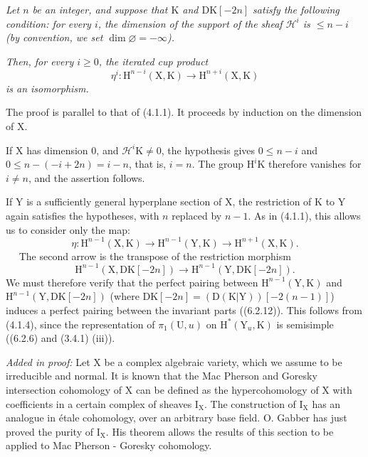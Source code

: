 \documentclass[11pt,leqno]{article}
\newcommand{\Page}[1]{\ifvmode\noindent\else\unskip\ \fi{\footnotesize\textcolor{gray}{[p.\,#1]}}\ \ignorespaces}
\begin{document}
\textit{Let \(n\) be an integer, and suppose that \(\mathrm{K}\) and \(\mathrm{DK}[-2n]\) satisfy the following condition: for every \(i\), the dimension of the support of the sheaf \(\mathscr{H}^i\) is \(\leq n-i\) (by convention, we set \(\dim\varnothing=-\infty\)).}

\textit{Then, for every \(i\geq0\), the iterated cup product}
\[
\eta^i:\mathrm{H}^{n-i}(\mathrm{X},\mathrm{K})
\to
\mathrm{H}^{n+i}(\mathrm{X},\mathrm{K})
\]
\textit{is an isomorphism.}

\medskip
The proof is parallel to that of (4.1.1). It proceeds by induction on the dimension of \(\mathrm{X}\).

If \(\mathrm{X}\) has dimension \(0\), and \(\mathscr{H}^i\mathrm{K}\neq0\), the hypothesis gives \(0\leq n-i\) and \(0\leq n-(-i+2n)=i-n\), that is, \(i=n\). The group \(\mathrm{H}^i\mathrm{K}\) therefore vanishes for \(i\neq n\), and the assertion follows.

If \(\mathrm{Y}\) is a sufficiently general hyperplane section of \(\mathrm{X}\), the restriction of \(\mathrm{K}\) to \(\mathrm{Y}\) again satisfies the hypotheses, with \(n\) replaced by \(n-1\). As in (4.1.1), this allows us to consider only the map:
\[
\eta:\mathrm{H}^{n-1}(\mathrm{X},\mathrm{K})
\to
\mathrm{H}^{n-1}(\mathrm{Y},\mathrm{K})
\to
\mathrm{H}^{n+1}(\mathrm{X},\mathrm{K}).
\]
\Page{251}
The second arrow is the transpose of the restriction morphism
\[
\mathrm{H}^{n-1}(\mathrm{X},\mathrm{DK}[-2n])
\to
\mathrm{H}^{n-1}(\mathrm{Y},\mathrm{DK}[-2n]).
\]
We must therefore verify that the perfect pairing between \(\mathrm{H}^{n-1}(\mathrm{Y},\mathrm{K})\) and \(\mathrm{H}^{n-1}(\mathrm{Y},\mathrm{DK}[-2n])\) (where \(\mathrm{DK}[-2n]=(\mathrm{D}(\mathrm{K}|\mathrm{Y}))[-2(n-1)]\)) induces a perfect pairing between the invariant parts ((6.2.12)). This follows from (4.1.4), since the representation of \(\pi_1(\mathrm{U},u)\) on \(\mathrm{H}^*(\mathrm{Y}_u,\mathrm{K})\) is semisimple ((6.2.6) and (3.4.1) (iii)).

\medskip
\textit{Added in proof:} Let \(\mathrm{X}\) be a complex algebraic variety, which we assume to be irreducible and normal. It is known that the Mac Pherson and Goresky intersection cohomology of \(\mathrm{X}\) can be defined as the hypercohomology of \(\mathrm{X}\) with coefficients in a certain complex of sheaves \(\mathrm{I}_{\mathrm{X}}\). The construction of \(\mathrm{I}_{\mathrm{X}}\) has an analogue in étale cohomology, over an arbitrary base field. O. Gabber has just proved the purity of \(\mathrm{I}_{\mathrm{X}}\). His theorem allows the results of this section to be applied to Mac Pherson - Goresky cohomology.
\end{document}
